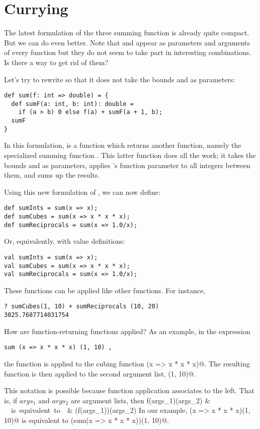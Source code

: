 \documentclass[11pt]{book}
\begin{document}
\section{Currying}

The latest formulation of the three summing function is already quite
compact. But we can do even better. Note that
\verb@a@ and \verb@b@ appear as parameters and arguments of every function
but they do not seem to take part in interesting combinations. Is
there a way to get rid of them?

Let's try to rewrite \verb@sum@ so that it does not take the bounds
\verb@a@ and \verb@b@ as parameters:
\begin{verbatim}
def sum(f: int => double) = {
  def sumF(a: int, b: int): double = 
    if (a > b) 0 else f(a) + sumF(a + 1, b);
  sumF
}
\end{verbatim}
In this formulation, \verb@sum@ is a function which returns another
function, namely the specialized summing function \verb@sumF@. This
latter function does all the work; it takes the bounds \verb@a@ and
\verb@b@ as parameters, applies \verb@sum@'s function parameter \verb@f@ to all
integers between them, and sums up the results. 

Using this new formulation of \verb@sum@, we can now define:
\begin{verbatim}
def sumInts = sum(x => x);
def sumCubes = sum(x => x * x * x);
def sumReciprocals = sum(x => 1.0/x);
\end{verbatim}
Or, equivalently, with value definitions:
\begin{verbatim}
val sumInts = sum(x => x);
val sumCubes = sum(x => x * x * x);
val sumReciprocals = sum(x => 1.0/x);
\end{verbatim}
These functions can be applied like other functions. For instance,
\begin{verbatim}
? sumCubes(1, 10) + sumReciprocals (10, 20)
3025.7687714031754
\end{verbatim}
How are function-returning functions applied? As an example, in the expression
\begin{verbatim}
sum (x => x * x * x) (1, 10) ,
\end{verbatim}
the function \verb@sum@ is applied to the cubing function 
\verb@(x => x * x * x)@. The resulting function is then 
applied to the second argument list, \verb@(1, 10)@.

This notation is possible because function application associates to the left.
That is, if $args_1$ and $args_2$ are argument lists, then 
f(args_1)(args_2) & \ \ \mbox{is equivalent to}\ \ & (f(args_1))(args_2)
\eda
In our example, \verb@sum(x => x * x * x)(1, 10)@ is equivalent to 
\verb@(sum(x => x * x * x))(1, 10)@.
\end{document}
